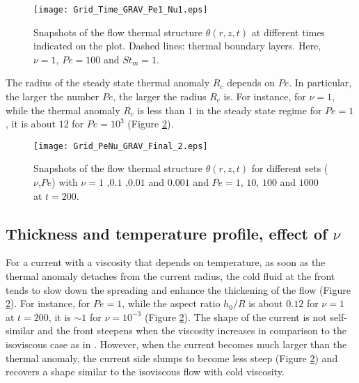 \begin{figure}
  \begin{center}
    \graphicspath{ {/Users/thorey/Documents/These/Projet/Refroidissement/Skin_Model/Figure/JFM_V13/} }
    \texttt{[image: Grid\_Time\_GRAV\_Pe1\_Nu1.eps]}
    \caption{Snapshots of  the flow thermal  structure $\theta(r,z,t)$
      at different times indicated on the plot.  Dashed lines: thermal
      boundary layers.  Here, $\nu=1$, $Pe =100$ and $St_m = 1$.}
    \label{Grid_Time_GRAV}
  \end{center}
\end{figure}

The radius of the steady state  thermal anomaly $R_c$ depends on $Pe$.
In  particular, the  larger the  number  $Pe$, the  larger the  radius
$R_c$ is. For instance, for $\nu=1$, while the thermal anomaly $R_c$ is less than $1$
in the  steady state  regime for  $Pe=1$, it  is about
$12$ for $Pe=10^3$ (Figure \ref{Grid_PeNu_GRAV}).

\begin{figure}
  \begin{center}
    \graphicspath{ {/Users/thorey/Documents/These/Projet/Refroidissement/Skin_Model/Figure/JFM_V13/} }
    \texttt{[image: Grid\_PeNu\_GRAV\_Final\_2.eps]}
    \caption{Snapshots of  the flow thermal  structure $\theta(r,z,t)$
      for different sets ($\nu$,$Pe$) with $\nu= 1$ ,$0.1$ ,$0.01$ and
      $0.001$ and  $Pe=1$, $10$,  $100$ and  $1000$ at  $t=200$.}
    \label{Grid_PeNu_GRAV}
  \end{center}
\end{figure}

\subsection{Thickness and temperature profile, effect of $\nu$}
\label{sec:thickn-temp-prof}

For a current with a viscosity that depends on temperature, as soon as
the thermal anomaly  detaches from the current radius,  the cold fluid
at  the  front tends  to  slow  down  the  spreading and  enhance  the
thickening of  the flow (Figure \ref{Grid_PeNu_GRAV}).   For instance,
for $Pe=1$, while the aspect ratio $h_0/R$ is about $0.12$ for $\nu=1$
at   $t=200$,    it   is   $\sim   1$    for   $\nu=10^{-3}$   (Figure
\ref{Grid_PeNu_GRAV}).  The  shape of the current  is not self-similar
and the front  steepens when the viscosity increases  in comparison to
the isoviscous case as  in \citet{Bercovici:2007vc}. However, when the
current becomes much larger than the thermal anomaly, the current side
slumps to become less steep (Figure \ref{Grid_PeNu_GRAV}) and recovers
a shape similar to the isoviscous flow with cold viscosity.

